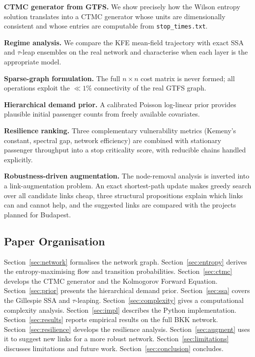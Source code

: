 \documentclass[12pt,a4paper]{article}
\theoremstyle{plain}
\theoremstyle{definition}
\theoremstyle{remark}
\begin{document}
\begin{description}[leftmargin=2em]
  \item[C1.] \textbf{CTMC generator from GTFS.}  We show precisely how the
    Wilson entropy solution translates into a CTMC generator whose units are
    dimensionally consistent and whose entries are computable from
    \texttt{stop\_times.txt}.
  \item[C2.] \textbf{Regime analysis.}  We compare the KFE mean-field
    trajectory with exact SSA and $\tau$-leap ensembles on the real network and
    characterise when each layer is the appropriate model.
  \item[C3.] \textbf{Sparse-graph formulation.}  The full $n\times n$ cost
    matrix is never formed; all operations exploit the $\ll1\%$ connectivity
    of the real GTFS graph.
  \item[C4.] \textbf{Hierarchical demand prior.}  A calibrated Poisson
    log-linear prior provides plausible initial passenger counts from freely
    available covariates.
  \item[C5.] \textbf{Resilience ranking.}  Three complementary vulnerability
    metrics (Kemeny's constant, spectral gap, network efficiency) are combined
    with stationary passenger throughput into a stop criticality score, with
    reducible chains handled explicitly.
  \item[C6.] \textbf{Robustness-driven augmentation.}  The node-removal
    analysis is inverted into a link-augmentation problem.  An exact
    shortest-path update makes greedy search over all candidate links cheap,
    three structural propositions explain which links can and cannot help, and
    the suggested links are compared with the projects planned for Budapest.
\end{description}

\subsection{Paper Organisation}

Section~\ref{sec:network} formalises the network graph.
Section~\ref{sec:entropy} derives the entropy-maximising flow and transition
probabilities.
Section~\ref{sec:ctmc} develops the CTMC generator and the Kolmogorov Forward
Equation.
Section~\ref{sec:prior} presents the hierarchical demand prior.
Section~\ref{sec:ssa} covers the Gillespie SSA and $\tau$-leaping.
Section~\ref{sec:complexity} gives a computational complexity analysis.
Section~\ref{sec:impl} describes the Python implementation.
Section~\ref{sec:results} reports empirical results on the full BKK network.
Section~\ref{sec:resilience} develops the resilience analysis.
Section~\ref{sec:augment} uses it to suggest new links for a more robust
network.
Section~\ref{sec:limitations} discusses limitations and future work.
Section~\ref{sec:conclusion} concludes.
\end{document}
